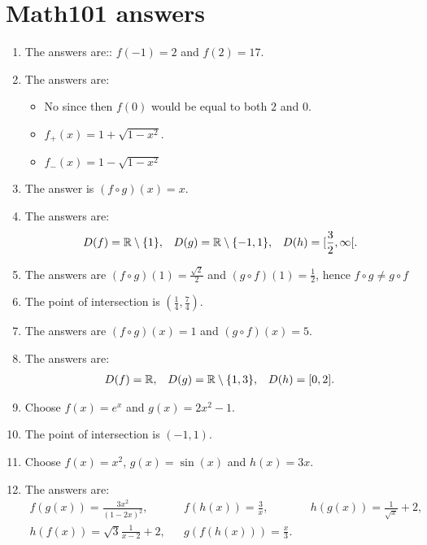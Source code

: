 \newpage
\section{Math101 answers}
\begin{enumerate}
	
	\item The answers are:: $f(-1)=2$ and $f(2)=17$.
	
	\item The answers are:
	\begin{itemize}
		\item No since then $f(0)$ would be equal to both $2$ and $0$.
		\item $f_+(x) = 1+\sqrt{1-x^2}$.
		\item $f_-(x) = 1-\sqrt{1-x^2}$
	\end{itemize}	
	
	\item The answer is $(f\circ g)(x)=x$.
	
	\item The answers are:
\begin{align*}
D(f)=\mathbb{R}\setminus\{1\},&& D(g)=\mathbb{R}\setminus\{-1,1\},&& D(h)=[\frac{3}{2},\infty[.
\end{align*}
	
	
	\item  The answers are $(f\circ g)(1)=\frac{\sqrt{2}}{2}$ and $(g\circ f)(1)=\frac{1}{2}$, hence $f\circ g\neq g\circ f$
	
	\item The point of intersection is $(\frac{1}{4},\frac{7}{4})$.	
	
		\item The answers are $(f\circ g)(x)=1$ and $(g\circ f)(x)=5$.
	
		\item The answers are:
	\begin{align*}
	D(f)=\mathbb{R},&& D(g)=\mathbb{R}\setminus\{1,3\},&& D(h)=[0,2].
	\end{align*}
	
	
	

	\item Choose $f(x)=e^x$ and $g(x)=2x^2-1$.
	
	\item The point of intersection is $(-1,1)$.
	
	\item Choose $f(x)=x^2$, $g(x)=\sin(x)$ and $h(x)=3x$.
	
	\item The answers are:
	\begin{align*}
	f(g(x))=\frac{3x^2}{(1-2x)^2},&& f(h(x))=\frac{3}{x},&& h(g(x))=\frac{1}{\sqrt{x}}+2,\\ h(f(x))=\sqrt{3}\frac{1}{x-2}+2,&&g(f(h(x)))=\frac{x}{3}.
	\end{align*} 
	

\end{enumerate}
